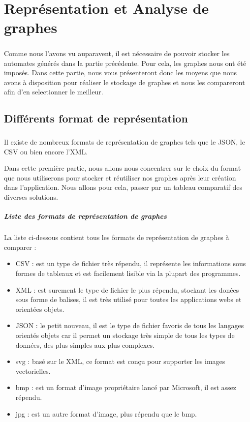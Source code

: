 \chapter{Représentation et Analyse de graphes}
\paragraph{}

Comme nous l'avons vu auparavent, il est nécessaire de pouvoir stocker les automates générés dans la partie précédente. Pour cela, les graphes nous ont été imposés. Dans cette partie, nous vous présenteront donc les moyens que nous avons à disposition pour réaliser le stockage de graphes et nous les compareront afin d'en selectionner le meilleur.

\section{Différents format de représentation}
  \paragraph{}
  Il existe de nombreux formats de représentation de graphes tels que le JSON, le CSV ou bien encore l'XML.
  
  Dans cette première partie, nous allons nous concentrer sur le choix du format que nous utiliserons pour stocker et réutiliser nos graphes après leur création dans l'application.
  Nous allons pour cela, passer par un tableau comparatif des diverses solutions.
  

  \paragraph{Liste des formats de représentation de graphes}
  La liste ci-dessous contient tous les formats de représentation de graphes à comparer : 
  \begin{itemize}
   \item CSV : est un type de fichier très répendu, il représente les informations sous formes de tableaux et est facilement lisible via la plupart des programmes. 
   \item XML : est surement le type de fichier le plus répendu, stockant les donées sous forme de balises, il est très utilisé pour toutes les applications webs et orientées objets. 
   \item JSON : le petit nouveau, il est le type de fichier favoris de tous les langages orientés objets car il permet un stockage très simple de tous les types de données, des plus simples aux plus complexes. 
   \item svg : basé sur le XML, ce format est conçu pour supporter les images vectorielles.
   \item bmp : est un format d'image propriétaire lancé par Microsoft, il est assez répendu.
   \item jpg : est un autre format d'image, plus répendu que le bmp.
  \end{itemize}

